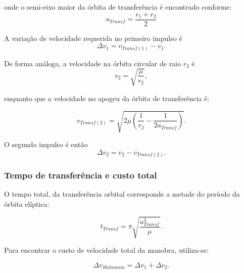 onde o semi-eixo maior da órbita de transferência é encontrado conforme:
\begin{equation}
a_{Transf}
=
\frac{r_1 + r_2}{2}
\end{equation}

A variação de velocidade requerida no primeiro impulso é
\begin{equation}
\Delta v_1
=
v_{Transf(1)}
-v_1.
\end{equation}

De forma análoga, a velocidade na órbita circular de raio $r_2$ é
\begin{equation}
v_2
=
\sqrt{\frac{\mu}{r_2}},
\end{equation}

enquanto que a velocidade no apogeu da órbita de transferência é:

\begin{equation}
v_{Transf(2)}
=
\sqrt{2\mu \left(\frac{1}{r_2}
-\frac{1}{2a_{Transf}}\right)}.
\end{equation}

O segundo impulso é então
\begin{equation}
\Delta v_2
=
v_2
-v_{Transf(2)}.
\end{equation}

\subsubsection{Tempo de transferência e custo total}
O tempo total, da transferência orbital corresponde a metade do período da órbita elíptica:

\begin{equation}
t_{Transf}
=
\pi \sqrt{\frac{a_{Transf}^3}{\mu}}.
\end{equation}

Para encontrar o custo de velocidade total da manobra, utiliza-se:

\begin{equation}
    \Delta v_{Hohmann} = \Delta v_1 + \Delta v_2.
\end{equation}

